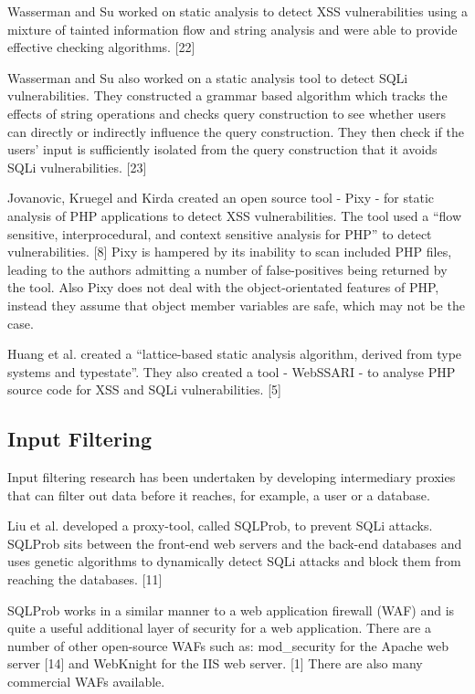 \documentclass[12pt,a4paper]{article}
\begin{document}
Wasserman and Su worked on static analysis to detect XSS vulnerabilities using a mixture of tainted information flow and  string analysis and were able to provide effective checking algorithms. [22]

Wasserman and Su also worked on a static analysis tool to detect SQLi vulnerabilities.  They constructed a grammar based algorithm which tracks the effects of string operations and checks query construction to see whether users can directly or indirectly influence the query construction.   They then check if the users’ input is sufficiently  isolated from the query construction that it avoids SQLi vulnerabilities. [23]

Jovanovic, Kruegel and  Kirda created an open source tool - Pixy - for static analysis of PHP applications to detect XSS vulnerabilities.  The tool used a “flow sensitive, interprocedural, and context sensitive analysis for PHP” to detect vulnerabilities. [8]  Pixy is hampered by its inability to scan included PHP files, leading to the authors admitting a number of false-positives being returned by the tool.  Also Pixy does not deal with the object-orientated features of PHP, instead they assume that object member variables are safe, which may not be the case.

Huang et al. created a “lattice-based static analysis algorithm, derived from type systems and typestate”.  They also created a tool - WebSSARI - to analyse PHP source code for XSS and SQLi vulnerabilities. [5]

\subsection{Input Filtering}
Input filtering research has been undertaken by developing intermediary proxies that can filter out data before it reaches, for example, a user or a database.

Liu et al. developed  a proxy-tool, called SQLProb, to prevent SQLi attacks.  SQLProb sits between the front-end web servers and the back-end databases and uses genetic algorithms to dynamically detect SQLi attacks and block them from reaching the databases. [11]

SQLProb works in a similar manner to a web application firewall (WAF) and is quite a useful additional layer of security for a web application.  There are a number of other open-source WAFs such as: mod\_security for the Apache web server [14] and WebKnight for the IIS web server. [1]  There are also many commercial WAFs available.
\end{document}
